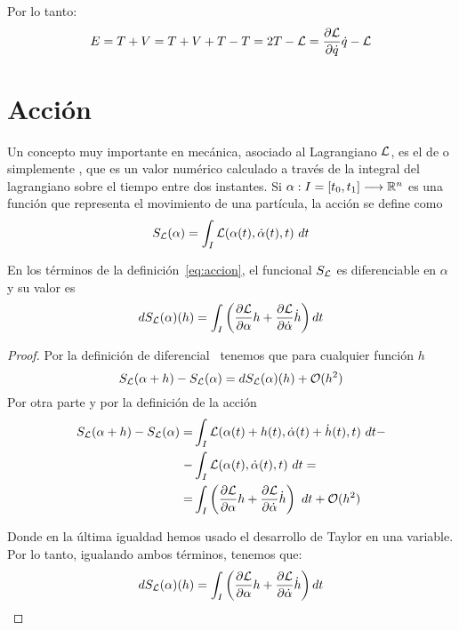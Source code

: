 Por lo tanto:
\begin{equation}
	\label{eq:energia-lagrangiana}
	E=T+V=T+V+T-T=2T-\mathcal{L}=\frac{\partial\mathcal{L}}{\partial\dot{q}}\dot{q}-\mathcal{L}
\end{equation}
\section{Acción}\label{sec:accion}

Un concepto muy importante en mecánica, asociado al Lagrangiano $\mathcal{L}$, es el de  o simplemente , que es un valor numérico calculado a través de la integral del lagrangiano sobre el tiempo entre dos instantes.
Si $\alpha:I=[t_0, t_1]\longrightarrow \mathbb{R}^n$ es una función que representa el movimiento de una partícula, la acción se define como
\begin{equation}
	\label{eq:accion}
	S_{\mathcal{L}}(\alpha) = \int_{I}\mathcal{L}(\alpha(t), \dot{\alpha}(t), t)\ dt
\end{equation}

\begin{proposition}
	En los términos de la definición~\eqref{eq:accion}, el funcional $S_{\mathcal{L}}$ es diferenciable en $\alpha$ y su valor es
	\begin{equation}
		\label{eq:accion_diferencial}
		dS_{\mathcal{L}}(\alpha)(h)=\int_{I}\left( \frac{\partial \mathcal{L}}{\partial\alpha}h+\frac{\partial \mathcal{L}}{\partial\dot{\alpha}}\dot{h}\right) dt
	\end{equation}
\end{proposition}
\begin{proof}
	Por la definición de diferencial~\cite{FV} tenemos que para cualquier función $h$
	\begin{equation*}
		S_{\mathcal{L}}(\alpha + h) -  S_{\mathcal{L}}(\alpha) = dS_{\mathcal{L}}(\alpha)(h) +\mathcal{O}(h^2)
	\end{equation*}
	Por otra parte y por la definición de la acción
	\begin{equation*}
		\begin{split}
			S_\lagrangiano(\alpha + h) -  S_\lagrangiano(\alpha) = & \int_{I}\lagrangiano(\alpha(t)+h(t), \dot{\alpha}(t)+\dot{h}(t), t)\ dt - \\
			- & \int_{I}\lagrangiano(\alpha(t), \dot{\alpha}(t), t)\ dt =\\
			=& \int_{I}\left( \frac{\partial \lagrangiano}{\partial\alpha}h+\frac{\partial \lagrangiano}{\partial\dot{\alpha}}\dot{h}\right)\ dt+\mathcal{O}(h^2)
		\end{split}
	\end{equation*}

	Donde en la última igualdad hemos usado el desarrollo de Taylor en una variable.
	Por lo tanto, igualando ambos términos, tenemos que:
	\begin{equation*}
		dS_{\mathcal{L}}(\alpha)(h) =\int_{I}\left( \frac{\partial \mathcal{L}}{\partial\alpha}h+\frac{\partial \mathcal{L}}{\partial\dot{\alpha}}\dot{h}\right) dt
	\end{equation*}
\end{proof}

